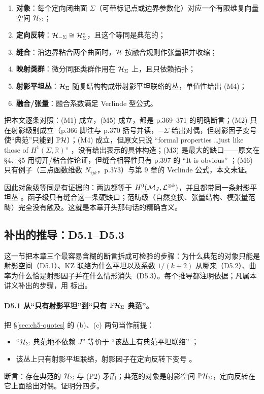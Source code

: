 \begin{enumerate}[leftmargin=1.6em,itemsep=2pt]
\item[(M1)] \textbf{对象}：每个定向闭曲面 $\Sigma$（可带标记点或边界参数化）对应一个有限维复向量空间 $\mathcal{H}_\Sigma$；
\item[(M2)] \textbf{定向反转}：$\mathcal{H}_{-\Sigma}\cong\mathcal{H}_\Sigma^{*}$，且这个等同是典范的；
\item[(M3)] \textbf{缝合}：沿边界粘合两个曲面时，$\mathcal{H}$ 按融合规则作张量积并收缩；
\item[(M4)] \textbf{映射类群}：微分同胚类群作用在 $\mathcal{H}_\Sigma$ 上，且只依赖拓扑；
\item[(M5)] \textbf{射影平坦丛}：$\mathcal{H}_\Sigma$ 随复结构构成带射影平坦联络的丛，单值性给出 (M4)；
\item[(M6)] \textbf{融合/张量}：融合系数满足 Verlinde 型公式。
\end{enumerate}

把本文逐条对照：(M1) 成立，(M5) 成立，都是 p.369--371 的明确断言；(M2) 只在射影级别成立（p.366 脚注与 p.370 括号并读，$-\Sigma$ 给出对偶，但射影因子变号使“典范”只能到 $\mathbb P\mathcal{H}$）；(M4) 成立，但原文只说 “formal properties \dots just like those of $H^1(\Sigma,\mathbb R)$” ，没有给出表示的具体构造；(M3) 是最大的缺口——原文在 \S4、\S5 用切开/粘合作论证，但缝合相容性只有 p.397 的 “It is obvious” ；(M6) 只有例子（三点函数维数 $N_{ijk}$，p.373）与第 9 章的 Verlinde 公式，本文未证。

因此对象级等同是有证据的：两边都等于 $H^0(\mathcal{M}_J,\mathcal{L}^{\otimes k})$，并且都带同一条射影平坦丛 。函子级只有缝合这一条硬缺口；范畴级（自然变换、张量结构、模张量范畴）完全没有触及。这就是本章开头那句话的精确含义。

\subsection{补出的推导：D5.1--D5.3}
\label{sec:ch5-deriv}

这一节把本章三个最容易含糊的断言拆成可检验的步骤：为什么典范的对象只能是射影空间（D5.1）、KZ 联络为什么平坦以及系数 $1/(k+2)$ 从哪来（D5.2）、曲率为什么恰是射影因子并在什么情形消失（D5.3）。每个推导都注明依据；凡属本讲义补出的步骤，用 \ours{} 标出。

\paragraph{D5.1 从“只有射影平坦”到“只有 $\mathbb P\mathcal{H}_\Sigma$ 典范”。}把 §\ref{sec:ch5-quotes} 的 (b)、(c) 两句当作前提：
\begin{itemize}[leftmargin=1.6em,itemsep=1pt]
\item[(P1)] “$\mathcal{H}_\Sigma$ 典范地不依赖 $J$” 等价于 “该丛上有典范平坦联络” ；
\item[(P2)] 该丛上只有射影平坦联络，射影因子在定向反转下变号 。
\end{itemize}
断言：存在典范的 $\mathcal{H}_\Sigma$ 与 (P2) 矛盾；典范的对象是射影空间 $\mathbb P\mathcal{H}_\Sigma$，定向反转在它上面给出对偶。证明分四步。

